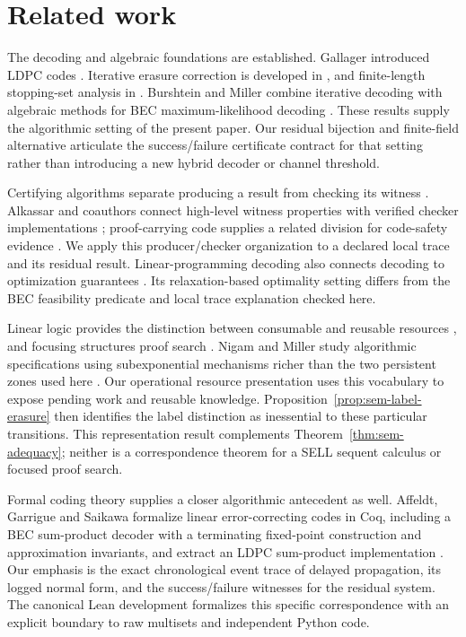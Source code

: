 \documentclass{lmcs}
\begin{document}





\section{Related work}\label{sec:related}
The decoding and algebraic foundations are established. Gallager introduced
LDPC codes \cite{Gallager1962}. Iterative erasure correction is developed
in \cite{LubyMitzenmacherShokrollahiSpielman2001}, and finite-length
stopping-set analysis in \cite{DiEtAl2002Stopping}.
Burshtein and Miller combine iterative decoding with algebraic methods
for BEC maximum-likelihood decoding \cite{BurshteinMiller2004ML}.
These results supply the algorithmic setting of the present paper.
Our residual bijection and finite-field alternative articulate the
success/failure certificate contract for that setting rather than
introducing a new hybrid decoder or channel threshold.

Certifying algorithms separate producing a result from checking its
witness \cite{McConnellEtAl2011}. Alkassar and coauthors connect
high-level witness properties with verified checker implementations
\cite{AlkassarEtAl2013}; proof-carrying code supplies a related division
for code-safety evidence \cite{Necula1997PCC}. We apply this producer/checker
organization to a declared local trace and its residual result.
Linear-programming decoding also connects decoding to optimization
guarantees \cite{FeldmanWainwrightKarger2005LP}. Its relaxation-based
optimality setting differs from the BEC feasibility predicate and local
trace explanation checked here.

Linear logic provides the distinction between consumable and reusable
resources \cite{Girard1987}, and focusing structures proof search
\cite{Andreoli1992Focusing}. Nigam and Miller study algorithmic
specifications using subexponential mechanisms richer than the two
persistent zones used here \cite{NigamMiller2009SELL}.
Our operational resource presentation uses this vocabulary to expose
pending work and reusable knowledge. Proposition~\ref{prop:sem-label-erasure}
then identifies the label distinction as inessential to these particular
transitions. This representation result complements
Theorem~\ref{thm:sem-adequacy}; neither is a correspondence theorem for a
SELL sequent calculus or focused proof search.

Formal coding theory supplies a closer algorithmic antecedent as well.
Affeldt, Garrigue and Saikawa formalize linear error-correcting codes in
Coq, including a BEC sum-product decoder with a terminating fixed-point
construction and approximation invariants, and extract an LDPC
sum-product implementation \cite{AffeldtGarrigueSaikawa2020}.
Our emphasis is the exact chronological event trace of delayed
propagation, its logged normal form, and the success/failure witnesses
for the residual system. The canonical Lean development formalizes this
specific correspondence with an explicit boundary to raw multisets and
independent Python code.
\end{document}
